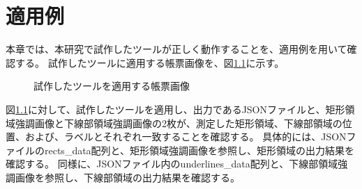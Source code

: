 \chapter{適用例}\label{cha:Indication}
本章では、本研究で試作したツールが正しく動作することを、適用例を用いて確認する。
試作したツールに適用する帳票画像を、図\ref{fig:indication_original}に示す。
\begin{figure}[tp]
    \begin{center}
        \caption{試作したツールを適用する帳票画像}
        \label{fig:indication_original}
    \end{center}
\end{figure}

図\ref{fig:indication_original}に対して、試作したツールを適用し、出力であるJSONファイルと、矩形領域強調画像と下線部領域強調画像の2枚が、測定した矩形領域、下線部領域の位置、および、ラベルとそれぞれ一致することを確認する。
具体的には、JSONファイルのrects\_data配列と、矩形領域強調画像を参照し、矩形領域の出力結果を確認する。
同様に、JSONファイル内のunderlines\_data配列と、下線部領域強調画像を参照し、下線部領域の出力結果を確認する。

